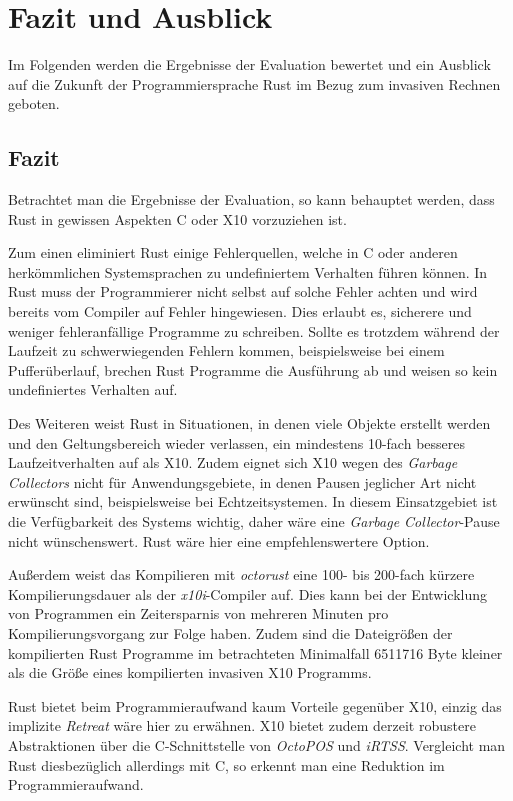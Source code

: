 \chapter{Fazit und Ausblick}\label{sec:conclusion}

Im Folgenden werden die Ergebnisse der Evaluation bewertet
und ein Ausblick auf die Zukunft der Programmiersprache Rust im Bezug zum invasiven Rechnen geboten.

\section{Fazit}

Betrachtet man die Ergebnisse der Evaluation, so kann behauptet werden,
dass Rust in gewissen Aspekten C oder X10 vorzuziehen ist.

Zum einen eliminiert Rust einige Fehlerquellen, welche in C oder anderen herkömmlichen
Systemsprachen zu undefiniertem Verhalten führen können.
In Rust muss der Programmierer nicht selbst auf solche Fehler achten und wird bereits vom Compiler auf Fehler
hingewiesen. Dies erlaubt es, sicherere und weniger fehleranfällige Programme zu schreiben.
Sollte es trotzdem während der Laufzeit zu schwerwiegenden Fehlern kommen, beispielsweise bei einem Pufferüberlauf,
brechen Rust Programme die Ausführung ab und weisen so kein undefiniertes Verhalten auf.

Des Weiteren weist Rust in Situationen, in denen viele Objekte erstellt werden und den Geltungsbereich wieder verlassen,
ein mindestens 10-fach besseres Laufzeitverhalten auf als X10.
Zudem eignet sich X10 wegen des \textit{Garbage Collectors}
nicht für Anwendungsgebiete, in denen Pausen jeglicher Art nicht erwünscht sind,
beispielsweise bei Echtzeitsystemen.
In diesem Einsatzgebiet ist die Verfügbarkeit des Systems wichtig, daher wäre eine \textit{Garbage Collector}-Pause
nicht wünschenswert. Rust wäre hier eine empfehlenswertere Option.

Außerdem weist das Kompilieren mit \textit{octorust} eine 100- bis 200-fach kürzere Kompilierungsdauer
als der \textit{x10i}-Compiler auf. Dies kann bei der Entwicklung von Programmen ein Zeitersparnis von
mehreren Minuten pro Kompilierungsvorgang zur Folge haben. 
Zudem sind die Dateigrößen der kompilierten Rust Programme im betrachteten Minimalfall 6511716 Byte kleiner
als die Größe eines kompilierten invasiven X10 Programms.

Rust bietet beim Programmieraufwand kaum Vorteile gegenüber X10, einzig das implizite \textit{Retreat} wäre hier zu 
erwähnen.
X10 bietet zudem derzeit robustere Abstraktionen über die C-Schnittstelle von \textit{OctoPOS} und
\textit{iRTSS}.
Vergleicht man Rust diesbezüglich allerdings mit C, so erkennt man eine Reduktion im Programmieraufwand.

